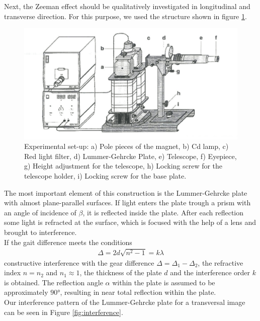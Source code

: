 Next, the Zeeman effect should be qualitatively investigated in longitudinal and transverse direction.
For this purpose, we used the structure shown in figure \ref{fig:structure}.
\begin{figure}[ht]
\centering
\includegraphics[scale=.9]{images//structure.png}
\caption{Experimental set-up: a) Pole pieces of the magnet, b) Cd lamp, c) Red light filter, d) Lummer-Gehrcke Plate, e) Telescope, f) Eyepiece, g) Height adjustment for the telescope, h) Locking screw for the telescope holder, i) Locking screw for the base plate. \cite{leaflets}}
\label{fig:structure}
\end{figure}
The most important element of this construction is the Lummer-Gehrcke plate with almost plane-parallel surfaces.
If light enters the plate trough a prism with an angle of incidence of $\beta$, it is reflected inside the plate.
After each reflection some light is refracted at the surface, which is focused with the help of a lens and brought to interference.\\
If the gait difference meets the conditions
\begin{align}
\Delta = 2d\sqrt{n^2-1} = k \lambda
\end{align}
constructive interference with the gear difference $\Delta=\Delta_1-\Delta_2$, the refractive index $n=n_2$ and $n_1\approx\num{1}$, the thickness of the plate $d$ and the interference order $k$ is obtained.
The reflection angle $\alpha$ within the plate is assumed to be approximately $\ang{90}$, resulting in near total reflection within the plate.\\
Our interference pattern of the Lummer-Gehrcke plate for a transversal image can be seen in Figure \ref{fig:interference}.
